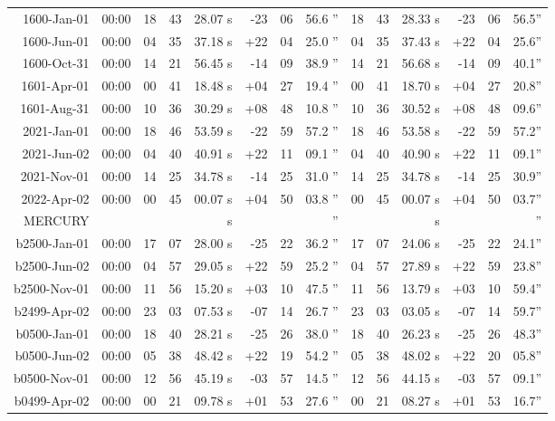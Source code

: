 \begin{longtable}{r@{\,}r|r@{h}r@{m}r<{s}|r@{°}r@{'}r<{''}||r@{h}r@{m}r<{s}|r@{°}r@{'}r<{''}}
 1600-Jan-01 & 00:00  &   18 & 43 & 28.07 & -23 & 06 & 56.6 & 18&43&28.33 & -23&06&56.5\\ %
 1600-Jun-01 & 00:00  &   04 & 35 & 37.18 & +22 & 04 & 25.0 & 04&35&37.43 & +22&04&25.6\\ %
 1600-Oct-31 & 00:00  &   14 & 21 & 56.45 & -14 & 09 & 38.9 & 14&21&56.68 & -14&09&40.1\\ %
 1601-Apr-01 & 00:00  &   00 & 41 & 18.48 & +04 & 27 & 19.4 & 00&41&18.70 & +04&27&20.8\\ %
 1601-Aug-31 & 00:00  &   10 & 36 & 30.29 & +08 & 48 & 10.8 & 10&36&30.52 & +08&48&09.6\\ %
 2021-Jan-01 & 00:00  &   18 & 46 & 53.59 & -22 & 59 & 57.2 & 18&46&53.58 & -22&59&57.2\\ %
 2021-Jun-02 & 00:00  &   04 & 40 & 40.91 & +22 & 11 & 09.1 & 04&40&40.90 & +22&11&09.1\\ %
 2021-Nov-01 & 00:00  &   14 & 25 & 34.78 & -14 & 25 & 31.0 & 14&25&34.78 & -14&25&30.9\\ %
 2022-Apr-02 & 00:00  &   00 & 45 & 00.07 & +04 & 50 & 03.8 & 00&45&00.07 & +04&50&03.7\\ %
MERCURY  \\
b2500-Jan-01 & 00:00  &   17 & 07 & 28.00 & -25 & 22 & 36.2 & 17&07&24.06 & -25&22&24.1\\ %
b2500-Jun-02 & 00:00  &   04 & 57 & 29.05 & +22 & 59 & 25.2 & 04&57&27.89 & +22&59&23.8\\ %
b2500-Nov-01 & 00:00  &   11 & 56 & 15.20 & +03 & 10 & 47.5 & 11&56&13.79 & +03&10&59.4\\ %
b2499-Apr-02 & 00:00  &   23 & 03 & 07.53 & -07 & 14 & 26.7 & 23&03&03.05 & -07&14&59.7\\ %
b0500-Jan-01 & 00:00  &   18 & 40 & 28.21 & -25 & 26 & 38.0 & 18&40&26.23 & -25&26&48.3\\ %
b0500-Jun-02 & 00:00  &   05 & 38 & 48.42 & +22 & 19 & 54.2 & 05&38&48.02 & +22&20&05.8\\ %
b0500-Nov-01 & 00:00  &   12 & 56 & 45.19 & -03 & 57 & 14.5 & 12&56&44.15 & -03&57&09.1\\ %
b0499-Apr-02 & 00:00  &   00 & 21 & 09.78 & +01 & 53 & 27.6 & 00&21&08.27 & +01&53&16.7\\ %

\end{longtable}
